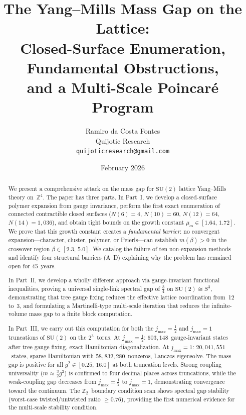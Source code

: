 \documentclass[12pt,a4paper]{article}
\title{The Yang--Mills Mass Gap on the Lattice:\\
Closed-Surface Enumeration, Fundamental Obstructions,\\
and a Multi-Scale Poincar\'e Program}
\author{Ramiro da Costa Fontes\\
{\small Quijotic Research}\\
{\small\texttt{quijoticresearch@gmail.com}}}
\date{February 2026}
\newcommand{\Z}{\mathbb{Z}}
\newcommand{\half}{\tfrac{1}{2}}
\begin{document}
\maketitle

\begin{abstract}
We present a comprehensive attack on the mass gap for $\mathrm{SU}(2)$ lattice Yang--Mills theory on~$\Z^4$. The paper has three parts. In Part~I, we develop a closed-surface polymer expansion from gauge invariance, perform the first exact enumeration of connected contractible closed surfaces ($N(6){=}4$, $N(10){=}60$, $N(12){=}64$, $N(14){=}1{,}036$), and obtain tight bounds on the growth constant $\mu_{\mathrm{cs}}\in[1.64,\,1.72]$. We prove that this growth constant creates a \emph{fundamental barrier}: no convergent expansion---character, cluster, polymer, or Peierls---can establish $m(\beta)>0$ in the crossover region $\beta\in[2.3,\,5.0]$. We catalog the failure of ten non-expansion methods and identify four structural barriers (A--D) explaining why the problem has remained open for 45~years.

In Part~II, we develop a wholly different approach via gauge-invariant functional inequalities, proving a universal single-link spectral gap of $\frac{3}{4}$ on $\mathrm{SU}(2)\cong S^3$, demonstrating that tree gauge fixing reduces the effective lattice coordination from~12 to~3, and formulating a Martinelli-type multi-scale iteration that reduces the infinite-volume mass gap to a finite block computation.

In Part~III, we carry out this computation for both the $j_{\max}=\half$ and $j_{\max}=1$ truncations of $\mathrm{SU}(2)$ on the $2^3$~torus. At $j_{\max}=\half$: $603{,}148$~gauge-invariant states after tree gauge fixing, exact Hamiltonian diagonalization. At $j_{\max}=1$: $20{,}041{,}551$~states, sparse Hamiltonian with $58{,}832{,}280$~nonzeros, Lanczos eigensolve. The mass gap is positive for all $g^2\in[0.25,\,16.0]$ at both truncation levels. Strong coupling universality ($m\approx\frac{3}{2}g^2$) is confirmed to four decimal places across truncations, while the weak-coupling gap decreases from $j_{\max}=\half$ to $j_{\max}=1$, demonstrating convergence toward the continuum. The $\Z_2$~boundary condition scan shows spectral gap stability (worst-case twisted/untwisted ratio $\ge 0.76$), providing the first numerical evidence for the multi-scale stability condition.
\end{abstract}

\tableofcontents
\end{document}
